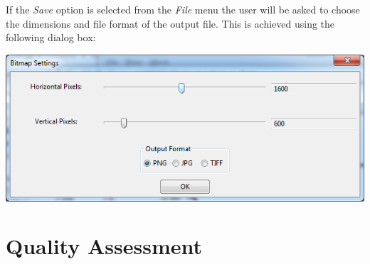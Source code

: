 \documentclass[11pt]{report}
\begin{document}
If the {\it Save} option is selected from the {\it File} menu the user will be asked to choose the dimensions and file format of the output file. This is achieved using the following dialog box:
\begin{center}
\includegraphics[scale=0.5]{bitmapsettings.png}
\end{center} 

\section{Quality Assessment}
\end{document}
